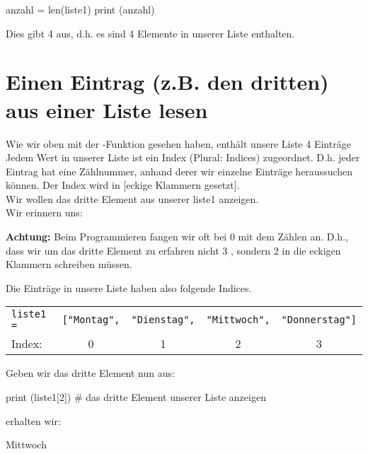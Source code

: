 \documentclass{\VorlagenPfad/coderdojokatext}
\begin{document}
\begin{pythoncode}
anzahl = len(liste1)  
print (anzahl) 
\end{pythoncode}
Dies gibt 4 aus, d.h. es sind 4 Elemente in unserer Liste enthalten.
\begin{pythoncode}
\end{pythoncode}
\section{Einen Eintrag (z.B. den dritten) aus einer Liste lesen}	
Wie wir oben mit der -Funktion gesehen haben, enthält unsere Liste 4 Einträge
\\

Jedem Wert in unserer Liste ist ein Index (Plural: Indices) zugeordnet. D.h. jeder Eintrag hat eine Zählnummer, anhand derer wir einzelne Einträge heraussuchen können. Der Index wird in [eckige Klammern gesetzt].	
\\
Wir wollen das dritte Element aus unserer liste1 anzeigen.\\
Wir erinnern uns:
\begin{merkbox}
\textbf{Achtung:} Beim Programmieren fangen wir oft bei 0 mit dem Zählen an.
D.h., dass wir um das dritte Element zu erfahren nicht 3 , sondern 2 in die
eckigen Klammern schreiben müssen.
\end{merkbox}
Die Einträge in unsere Liste haben also folgende Indices.

\begin{table}[width=\textwidth]
	\begin{tabular}{lllll}
		\texttt{liste1 =} &
		\texttt{["Montag",}  	& \texttt{"Dienstag",}         &		\texttt{"Mittwoch",} & \texttt{"Donnerstag"]}               \\
		
		Index:  & \multicolumn{1}{c}{0} & \multicolumn{1}{c}{1} & \multicolumn{1}{c}{2} & \multicolumn{1}{c}{3} \\
	\end{tabular}
\end{table}

Geben wir das dritte Element nun aus:
\begin{pythoncode}
print (liste1[2])      # das dritte Element unserer Liste anzeigen	
\end{pythoncode}
erhalten wir:
\begin{pseudocode}
Mittwoch
\end{pseudocode}
\end{document}
